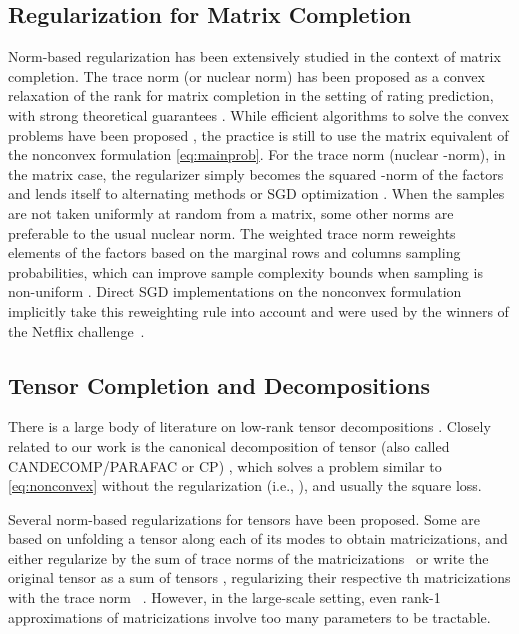 \documentclass{article}
\newcommand{\CP}{{CP}\xspace}
\begin{document}
\subsection{Regularization for Matrix Completion}
\label{sec:matNorm}
Norm-based regularization has been extensively studied in the context
of matrix completion. The trace norm (or nuclear norm) has been
proposed as a convex relaxation of the rank
\citep{srebro_maximum-margin_2005} for matrix completion in the
setting of rating prediction, with strong theoretical guarantees
\citep{candes_exact_2009}. While efficient algorithms to solve the
convex problems have been proposed 
\citep[see e.g.][]{cai_singular_2010,jaggi_simple_2010}, the practice is still to
use the matrix equivalent of the nonconvex formulation
\eqref{eq:mainprob}. For the trace norm (nuclear -norm), in the
matrix case, the regularizer simply becomes the squared -norm of the factors and lends itself to alternating methods or SGD optimization
\citep{rennie_fast_2005,koren_matrix_2009}. When the samples are not
taken uniformly at random from a matrix, some other norms are
preferable to the usual nuclear norm. The weighted trace norm
reweights elements of the factors based on the marginal rows and columns sampling probabilities, which can improve sample complexity bounds when sampling is non-uniform  \citep{foygel_learning_2011,negahban_restricted_2012}. Direct SGD
implementations on the nonconvex formulation implicitly take this reweighting rule into account and were used by the winners of the Netflix challenge~\citep[see][Section 5]{srebro_collaborative_2010}.


\subsection{Tensor Completion and Decompositions}
There is a large body of literature on low-rank tensor decompositions
\citep[see][for a comprehensive review]{kolda_tensor_2009}. Closely
related to our work is the canonical decomposition of tensor (also
called CANDECOMP/PARAFAC or \CP) \citep{hitchcock_expression_1927},
which solves a problem similar to \eqref{eq:nonconvex} without the
regularization (i.e., ), and usually the square
loss.

Several norm-based regularizations for tensors have been proposed. Some are based on unfolding a tensor along each of its modes to obtain matricizations, and either regularize by the sum of trace norms of the matricizations~\citep{tomioka_estimation_2010} or write the original tensor
as a sum of tensors , regularizing their respective th matricizations with the trace norm ~\citep{wimalawarne_multitask_2014}. However, in the large-scale setting, even rank-1 approximations of matricizations involve too many parameters to be tractable.
\end{document}
